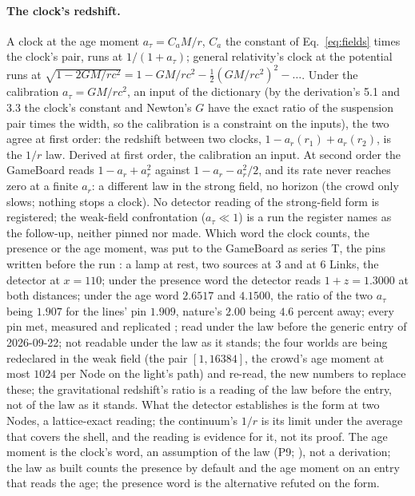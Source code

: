 \paragraph{The clock's redshift.} A clock at the age moment $a_\tau =
C_a M/r$, $C_a$ the constant of Eq.~\eqref{eq:fields} times the clock's
pair, runs at $1/(1 + a_\tau)$; general relativity's clock at the potential runs
at $\sqrt{1 - 2GM/rc^2} = 1 - GM/rc^2 - \tfrac12 (GM/rc^2)^2 - \dots$.
Under the calibration $a_\tau = GM/rc^2$, an input of the dictionary (by the derivation's 5.1 and 3.3 the clock's constant and Newton's $G$ have the exact ratio of the suspension pair times the width, so the calibration is a constraint on the inputs), the two agree at first order: the redshift between
two clocks, $1 - a_r(r_1) + a_r(r_2)$, is the $1/r$ law. Derived at first order, the calibration an input. At second order the GameBoard reads $1 - a_r + a_r^2$ against $1 - a_r -
a_r^2/2$, and its rate never reaches zero at a finite $a_r$: a different law
in the strong field, no horizon (the crowd only slows; nothing stops a
clock). No detector reading of the strong-field form is registered; the
weak-field confrontation ($a_\tau \ll 1$) is a run the register names
as the follow-up, neither pinned nor made. Which word the clock counts, the presence or the age moment, was put to the GameBoard as series T, the pins written before the run \cite{register,clockage}: a lamp at rest, two sources at $3$ and at $6$ Links, the detector at $x = 110$; under the presence word the detector reads $1 + z = 1.3000$ at both distances; under the age word $2.6517$ and $4.1500$, the ratio of the two $a_\tau$ being $1.907$ for the lines' pin $1.909$, nature's $2.00$ being $4.6$ percent away; every pin met, measured and replicated \cite{replications}; read under the law before the generic entry of 2026-09-22; not readable under the law as it stands; the four worlds are being redeclared in the weak field (the pair $[1, 16384]$, the crowd's age moment at most $1024$ per Node on the light's path) and re-read, the new numbers to replace these; the gravitational redshift's ratio is a reading of the law before the entry, not of the law as it stands. What the detector establishes is the form at two Nodes, a lattice-exact reading; the continuum's $1/r$ is its limit under the average that covers the shell, and the reading is evidence for it, not its proof.
 The age moment is the clock's word, an assumption of the law (P9; \cite[record 394]{log}), not a derivation; the law as built counts the presence by default and the age moment on an entry that reads the age; the presence word is the alternative refuted on the form. 



